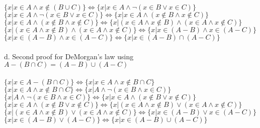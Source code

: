 \documentclass[]{article}
\begin{document}
\begin{enumerate}
    \newline $\{x|x \in A \land x \notin (B \cup C)\} \iff \{x|x \in A \land \neg(x \in B \lor x \in C)\}$
    \newline $\{x|x \in A \land \neg(x \in B \lor x \in C)\} \iff \{x|x \in A \land (x \notin B \land x \notin C)\}$
    \newline $\{x|x \in A \land (x \notin B \land x \notin C)\} \iff \{x|(x \in A \land x \notin B) \land (x \in A \land x \notin C)\}$
    \newline $\{x|(x \in A \land x \notin B) \land (x \in A \land x \notin C)\} \iff \{x|x \in (A - B) \land x \in (A - C)\}$
    \newline $\{x|x \in (A - B) \land x \in (A - C)\} \iff \{x|x \in (A - B) \cap (A - C)\}$
    \\\\d.
    \newline Second proof for DeMorgan's law using $A - (B \cap C) = (A - B) \cup (A - C)$
    \\\\$\{x|x \in A - (B \cap C)\} \iff \{x|x \in A \land x \notin B \cap C\}$
    \newline $\{x|x \in A \land x \notin B \cap C\} \iff \{x|A \land \neg (x \in B \land x \in C)\}$
    \newline $\{x|A \land \neg (x \in B \land x \in C)\} \iff \{x|x \in A \land (x \notin B \lor x \notin C)\}$
    \newline $\{x|x \in A \land (x \notin B \lor x \notin C)\} \iff \{x|(x \in A \land x \notin B) \lor (x \in A \land x \notin C)\}$
    \newline $\{x|(x \in A \land x \notin B) \lor (x \in A \land x \notin C)\} \iff \{x|x \in (A - B) \lor x \in (A - C)\}$
    \newline $\{x|x \in (A - B) \lor (A - C)\} \iff \{x|x \in (A - B) \cup (A - C)\}$
    

\end{enumerate}
\end{document}
